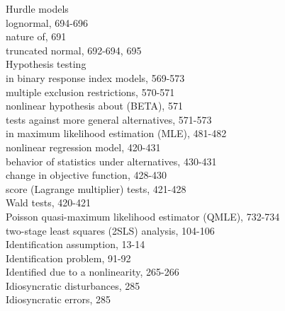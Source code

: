 \documentclass[10pt]{article}
\begin{document}
Hurdle models\\
lognormal, 694-696\\
nature of, 691\\
truncated normal, 692-694, 695\\
Hypothesis testing\\
in binary response index models, 569-573\\
multiple exclusion restrictions, 570-571\\
nonlinear hypothesis about (BETA), 571\\
tests against more general alternatives, 571-573\\
in maximum likelihood estimation (MLE), 481-482\\
nonlinear regression model, 420-431\\
behavior of statistics under alternatives, 430-431\\
change in objective function, 428-430\\
score (Lagrange multiplier) tests, 421-428\\
Wald tests, 420-421\\
Poisson quasi-maximum likelihood estimator (QMLE), 732-734\\
two-stage least squares (2SLS) analysis, 104-106\\
Identification assumption, 13-14\\
Identification problem, 91-92\\
Identified due to a nonlinearity, 265-266\\
Idiosyncratic disturbances, 285\\
Idiosyncratic errors, 285
\end{document}
